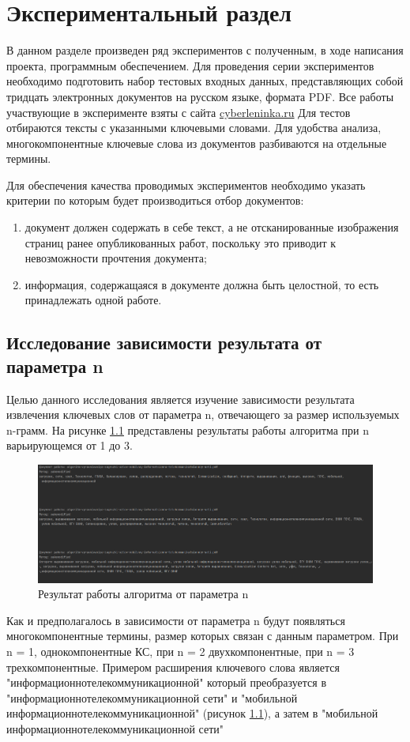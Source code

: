 \chapter{Экспериментальный раздел}
В данном разделе произведен ряд экспериментов с полученным, в ходе написания проекта, программным обеспечением.
Для проведения серии экспериментов необходимо подготовить набор тестовых входных данных, представляющих собой тридцать электронных документов на русском языке, формата PDF.
Все работы участвующие в эксперименте взяты с сайта \href{https://cyberleninka.ru/article}{cyberleninka.ru}
Для тестов отбираются тексты с указанными ключевыми словами.
Для удобства анализа, многокомпонентные ключевые слова из документов разбиваются на отдельные термины.

Для обеспечения качества проводимых экспериментов необходимо указать критерии по которым будет производиться отбор документов:
\begin{enumerate}
	\item документ должен содержать в себе текст, а не отсканированные изображения страниц ранее опубликованных работ, поскольку это приводит к невозможности прочтения документа;
	\item информация, содержащаяся в документе должна быть целостной, то есть принадлежать одной работе.
\end{enumerate}

\section{Исследование зависимости результата от параметра n}
Целью данного исследования является изучение зависимости результата извлечения ключевых слов от параметра n, отвечающего за размер используемых n-грамм.
На рисунке \ref{fig:experiment24} представлены результаты работы алгоритма при n варьирующемся от 1 до 3.

\begin{figure}[!h]
	\centering
	\includegraphics[width=1\linewidth]{src/img/experiment/experiment_2_4}
	\caption{Результат работы алгоритма от параметра n}
	\label{fig:experiment24}
\end{figure}
Как и предполагалось в зависимости от параметра n будут появляться многокомпонентные термины, размер которых связан с  данным параметром.
При n = 1, однокомпонентные КС, при n = 2 двухкомпонентные, при n = 3 трехкомпонентные.
Примером расширения ключевого слова является "информационнотелекоммуникационной" который преобразуется в "информационнотелекоммуникационной сети" и "мобильной информационнотелекоммуникационной" (рисунок \ref{fig:experiment24}), а затем в "мобильной информационнотелекоммуникационной сети"

